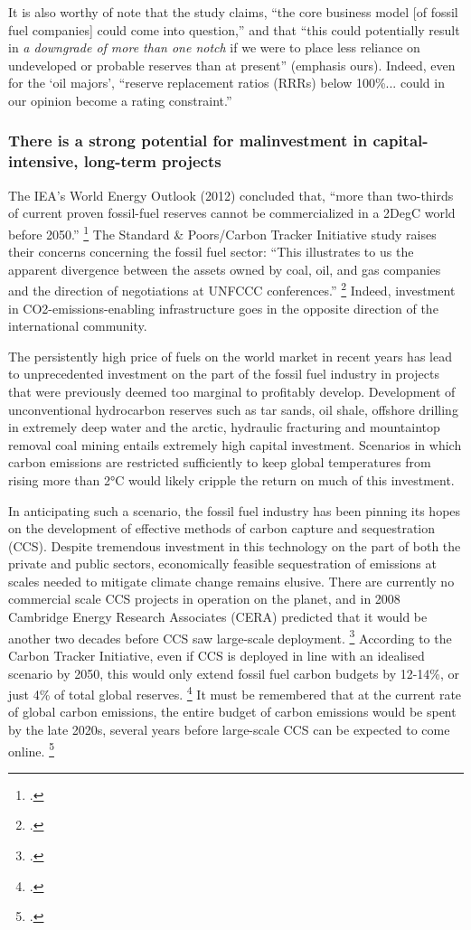   It is also worthy of note that the study claims, ``the core business model [of fossil fuel companies] could come into question,'' and that ``this could potentially result in \emph{a downgrade of more than one notch} if we were to place less reliance on undeveloped or probable reserves than at present'' (emphasis ours).
  Indeed, even for the `oil majors', ``reserve replacement ratios (RRRs) below 100\%... could in our opinion become a rating constraint.''
  
  


\subsubsection {There is a strong potential for malinvestment in capital-intensive, long-term projects}

The IEA's World Energy Outlook (2012) concluded that, ``more than two-thirds of current proven fossil-fuel reserves cannot be commercialized in a 2DegC world before 2050.'' \footcite{IEA2012}
The Standard & Poors/Carbon Tracker Initiative study raises their concerns concerning the fossil fuel sector: ``This illustrates to us the apparent divergence between the assets owned by coal, oil, and gas companies and the direction of negotiations at UNFCCC conferences.'' \footcite{SandPConstrained}
Indeed, investment in CO2-emissions-enabling infrastructure goes in the opposite direction of the international community.

The persistently high price of fuels on the world market in recent years has lead to unprecedented investment on the part of the fossil fuel industry in projects that were previously deemed too marginal to profitably develop. 
Development of unconventional hydrocarbon reserves such as tar sands, oil shale, offshore drilling in extremely deep water and the arctic, hydraulic fracturing and mountaintop removal coal mining entails extremely high capital investment. 
Scenarios in which carbon emissions are restricted sufficiently to keep global temperatures from rising more than 2°C would likely cripple the return on much of this investment.

In anticipating such a scenario, the fossil fuel industry has been pinning its hopes on the development of effective methods of carbon capture and sequestration (CCS). 
Despite tremendous investment in this technology on the part of both the private and public sectors, economically feasible sequestration of emissions at scales needed to mitigate climate change remains elusive. 
There are currently no commercial scale CCS projects in operation on the planet, and in 2008 Cambridge Energy Research Associates (CERA) predicted that it would be another two decades before CCS saw large-scale deployment. \footcite{CERACrossing}
According to the Carbon Tracker Initiative, even if CCS is deployed in line with an idealised scenario by 2050, this would only extend fossil fuel carbon budgets by 12-14\%, or just 4\% of total global reserves. \footcite{CTI2013}
It must be remembered that at the current rate of global carbon emissions, the entire budget of carbon emissions would be spent by the late 2020s, several years before large-scale CCS can be expected to come online. \footcite{CTI2012}

